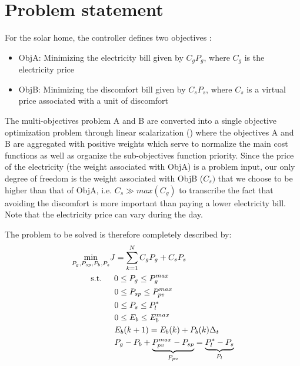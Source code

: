 \documentclass{ifacconf}
\begin{document}
\section{Problem statement}\label{Prob_Statement}
For the solar home, the controller defines two objectives :
\begin{itemize}
    \item ObjA: Minimizing the electricity bill given by $C_gP_g$, where $C_g$ is the electricity price
    \item ObjB: Minimizing the  discomfort bill given by $C_sP_s$, where $C_s$ is a virtual price associated with a unit of discomfort
\end{itemize}
The multi-objectives problem A and B are converted into a single objective optimization problem through linear scalarization (\cite{Deb2014}) where the objectives A and B are aggregated with positive weights which serve to normalize the main cost functions as well as organize the sub-objectives function
priority. Since the price of the electricity (the weight associated with ObjA) is a problem input, our only degree of freedom is the weight associated with ObjB ($C_s)$ that we choose to be higher than that of ObjA, i.e. $C_s \gg max(C_g)$ to transcribe the fact that avoiding the discomfort is more important than paying a lower electricity bill. Note that the electricity price can vary during the day.

The problem to be solved is therefore completely  described by:
\begin{align} 
& \underset{P_g,P_{sp},P_b,P_s}{\text{min}} J = \sum_{k=1}^{N} C_gP_g + C_sP_s \label{eq:cost2min}\\
& \text{\hspace{20px} s.t.\hspace{15px}} 0 \leq P_g\leq P_g^{max} \label{eq:Pgr_cons} \\
& \hspace{52px} 0 \leq P_{sp} \leq P_{pv}^{max} \label{eq:Pcu_cons}\\
& \hspace{52px} 0 \leq P_s \leq P_l^* \label{eq:Psh_cons} \\
& \hspace{52px} 0 \leq E_b \leq E_b^{max} \label{eq:Est_cons} \\
& \hspace{52px} E_b(k+1) = E_b(k) + P_b(k)\Delta_t \label{eq:Est_dyn}  \\
& \hspace{52px} P_g- P_b+ \underbrace{P_{pv}^{max}-P_{sp}}_{P_{pv}} =\underbrace{P_l^* - P_s}_{P_l} \label{eq:Engy_csvt} 
\end{align}
\end{document}
